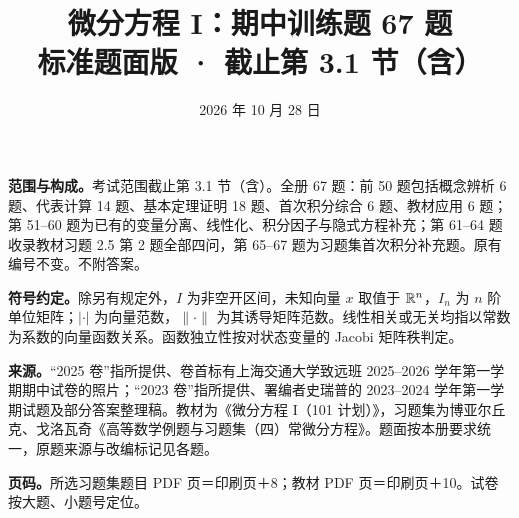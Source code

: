 
\newcommand{\problem}[3]{\refstepcounter{exercise}\subsection*{\theexercise.\quad #1}\label{ex:#2}\textit{出处：#3}\par}
\title{微分方程 I：期中训练题 67 题\\\large 标准题面版 · 截止第 3.1 节（含）}
\author{}\date{2026 年 10 月 28 日}
\maketitle\vspace{-2em}
\textbf{范围与构成。}考试范围截止第 3.1 节（含）。全册 67 题：前 50 题包括概念辨析 6 题、代表计算 14 题、基本定理证明 18 题、首次积分综合 6 题、教材应用 6 题；第 51--60 题为已有的变量分离、线性化、积分因子与隐式方程补充；第 61--64 题收录教材习题 2.5 第 2 题全部四问，第 65--67 题为习题集首次积分补充题。原有编号不变。不附答案。

\textbf{符号约定。}除另有规定外，$I$ 为非空开区间，未知向量 $x$ 取值于 $\mathbb R^n$，$I_n$ 为 $n$ 阶单位矩阵；$|\cdot|$ 为向量范数，$\|\cdot\|$ 为其诱导矩阵范数。线性相关或无关均指以常数为系数的向量函数关系。函数独立性按对状态变量的 Jacobi 矩阵秩判定。

\textbf{来源。}“2025 卷”指所提供、卷首标有上海交通大学致远班 2025--2026 学年第一学期期中试卷的照片；“2023 卷”指所提供、署编者史瑞普的 2023--2024 学年第一学期试题及部分答案整理稿。教材为《微分方程 I（101 计划）》，习题集为博亚尔丘克、戈洛瓦奇《高等数学例题与习题集（四）常微分方程》。题面按本册要求统一，原题来源与改编标记见各题。

\textbf{页码。}所选习题集题目 PDF 页＝印刷页＋8；教材 PDF 页＝印刷页＋10。试卷按大题、小题号定位。

\begingroup\small\setlength{\parskip}{0pt}\tableofcontents\endgroup\newpage
